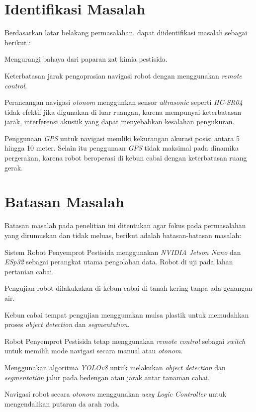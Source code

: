 \section{Identifikasi Masalah}
Berdasarkan latar belakang permasalahan, dapat diidentifikasi masalah
sebagai berikut :
\begin{packed_enum}
	\item Mengurangi bahaya dari paparan zat kimia pestisida.
	\item Keterbatasan jarak pengoprasian navigasi robot dengan menggunakan \textit{remote control}.
	\item Perancangan navigasi \textit{otonom} menggunkan sensor \textit{ultrasonic} seperti \textit{HC-SR04} tidak efektif jika digunakan di luar ruangan, karena mempunyai keterbatasan jarak, interferensi akustik yang dapat menyebabkan kesalahan pengukuran.
	\item Penggunaan \textit{GPS} untuk navigasi memliki kekurangan akurasi posisi antara 5 hingga 10 meter. Selain itu penggunaan \textit{GPS} tidak maksimal pada dinamika pergerakan, karena robot beroperasi di kebun cabai dengan keterbatasan ruang gerak.
\end{packed_enum}

\section{Batasan Masalah}
Batasan masalah pada penelitian ini ditentukan agar fokus pada permasalahan
yang dirumuskan dan tidak meluas, berikut adalah batasan-batasan masalah:
\begin{packed_enum}
	\item Sistem Robot Penyemprot Pestisida menggunakan  \textit{NVIDIA Jetson Nano} dan \textit{ESp32} sebagai perangkat utama pengolahan data. Robot di uji pada lahan pertanian cabai.
	\item Pengujian robot dilakukakan di kebun cabai di tanah kering tanpa ada genangan air.
	\item Kebun cabai tempat pengujian menggunakan mulsa plastik untuk memudahkan proses \textit{object detection} dan \textit{segmentation}.
	\item Robot Penyemprot Pestisida tetap menggunakan \textit{remote control}
	sebagai \textit{switch} untuk memilih mode navigasi secara manual atau \textit{otonom}.
	\item Menggunakan algoritma \textit{YOLOv8} untuk melakukan \textit{object detection} dan \textit{segmentation} jalur pada bedengan atau jarak antar tanaman cabai.
	\item Navigasi robot secara \textit{otonom} menggunakan \textit{uzzy Logic Controller} untuk mengendalikan putaran da arah roda.
\end{packed_enum}

